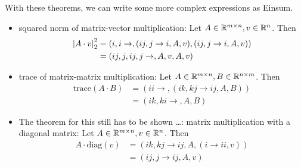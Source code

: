 With these theorems, we can write some more complex expressions as Einsum.
\begin{itemize}
    \item squared norm of matrix-vector multiplication: Let $A \in \mathbb{R}^{m \times n}, v \in \mathbb{R}^{n}$. Then
          \begin{align*}
              \left| A \cdot v \right|_2^2 & = (i,i\rightarrow,(ij, j \rightarrow i, A, v),(ij, j \rightarrow i, A, v)) \\
                                  & = (ij,j,ij,j\rightarrow,A,v,A,v)
          \end{align*}
    \item trace of matrix-matrix multiplication: Let $A \in \mathbb{R}^{m \times n}, B \in \mathbb{R}^{n \times m}$. Then
          \begin{align*}
              \text{trace}(A \cdot B) & = (ii \rightarrow, (ik, kj \rightarrow ij, A, B)) \\
                                      & = (ik, ki \rightarrow, A, B)
          \end{align*}
    \item The theorem for this still has to be shown \dots:
          matrix multiplication with a diagonal matrix: Let $A \in \mathbb{R}^{m \times n}, v \in \mathbb{R}^{n}$. Then
          \begin{align*}
              A \cdot \text{diag}(v) & = (ik, kj \rightarrow ij, A, (i \rightarrow ii, v)) \\
                                     & = (ij, j \rightarrow ij, A, v)                      \\
          \end{align*}
\end{itemize}


